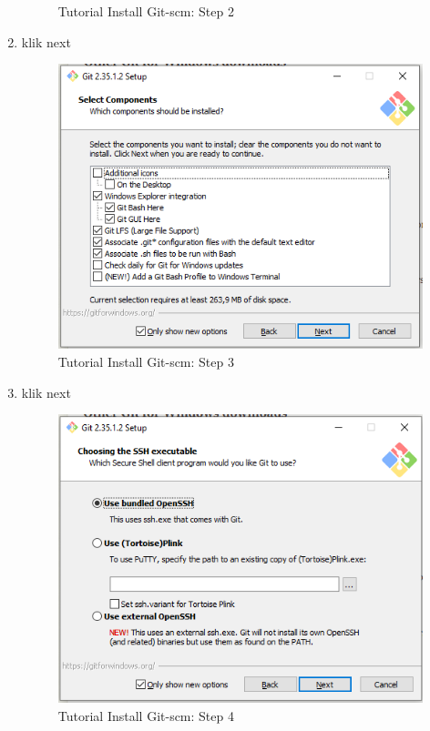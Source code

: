 \begin{enumerate}
\begin{figure}[H]
        \caption{Tutorial Install Git-scm: Step 2}
\end{figure}
\item klik next
\begin{figure}[H]
        \centerline{\includegraphics[scale=0.5]{figures/instalasi-git-scm-windows/step3}}
        \caption{Tutorial Install Git-scm: Step 3}
\end{figure}
\item klik next
\begin{figure}[H]
        \centerline{\includegraphics[scale=0.5]{figures/instalasi-git-scm-windows/step4}}
        \caption{Tutorial Install Git-scm: Step 4}

\end{figure}
\end{enumerate}
